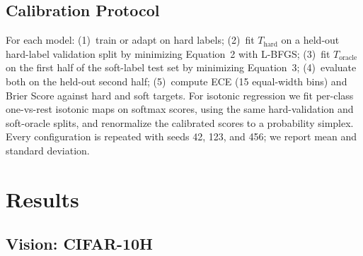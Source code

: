 \documentclass[11pt,a4paper]{article}
\theoremstyle{definition}
\begin{document}
\subsection{Calibration Protocol}

For each model: (1)~train or adapt on hard labels; (2)~fit $T_{\mathrm{hard}}$
on a held-out hard-label validation split by minimizing Equation~2 with
L-BFGS; (3)~fit $T_{\mathrm{oracle}}$ on the first half of the soft-label
test set by minimizing Equation~3; (4)~evaluate both on the held-out
second half; (5)~compute ECE (15 equal-width bins) and Brier Score
against hard and soft targets. For isotonic regression we fit per-class
one-vs-rest isotonic maps \cite{Zadrozny2002} on softmax scores, using
the same hard-validation and soft-oracle splits, and renormalize the
calibrated scores to a probability simplex. Every configuration is
repeated with seeds 42, 123, and 456; we report mean and standard
deviation.

\section{Results}
\label{sec:results}

\subsection{Vision: CIFAR-10H}

\begin{table}[t]
\centering
\caption{Calibration results on CIFAR-10H across three ResNet scales.
Values are mean (std) over 3 seeds. ECE is against hard argmax labels;
BS is against the full soft distribution.
Gap~$=$~TS-Hard BS $-$ TS-Soft BS (from unrounded values).
TS-Soft is an oracle condition that requires soft labels at fit time.}
\label{tab:vision}
\footnotesize
\setlength{\tabcolsep}{2.8pt}
\end{table}
\end{document}
